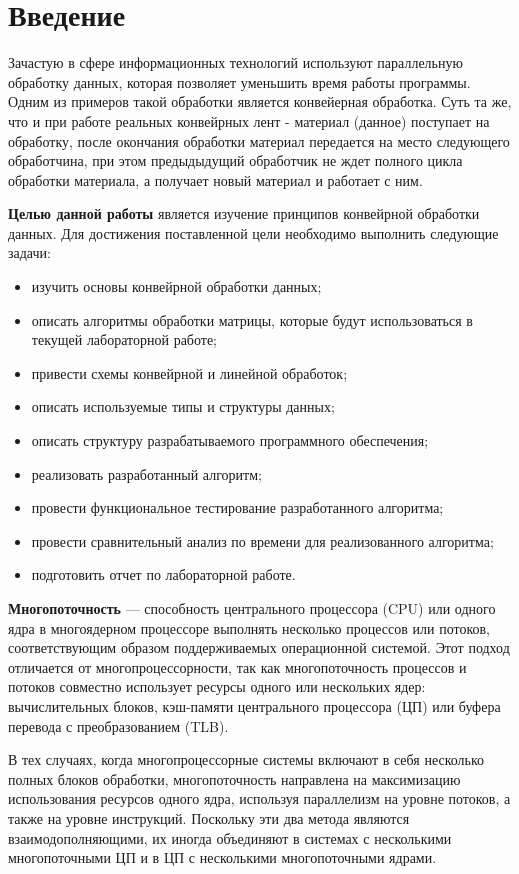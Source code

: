\chapter*{Введение}
Зачастую в сфере информационных технологий используют параллельную обработку данных, которая позволяет уменьшить время работы программы. Одним из примеров такой обработки является конвейерная обработка.
Суть та же, что и при работе реальных конвейрных лент - материал (данное) поступает на обработку, после окончания обработки материал передается на место следующего обработчина, при этом предыдыдущий обработчик не ждет полного цикла обработки материала, а получает новый материал и работает с ним.


\textbf{Целью данной работы} является изучение принципов конвейрной обработки данных. 
Для достижения поставленной цели необходимо выполнить следующие задачи:
\begin{itemize}[label=---]
	\item изучить основы конвейрной обработки данных;
    \item описать алгоритмы обработки матрицы, которые будут использоваться в текущей лабораторной работе;
    \item привести схемы конвейрной и линейной обработок;
    \item описать используемые типы и структуры данных;
    \item описать структуру разрабатываемого программного обеспечения;
    \item реализовать разработанный алгоритм;
    \item провести функциональное тестирование разработанного алгоритма;
    \item провести сравнительный анализ по времени для реализованного алгоритма;
    \item подготовить отчет по лабораторной работе.
\end{itemize}

\textbf{Многопоточность} \cite{mnog} --- способность центрального процессора (CPU) или одного ядра в многоядерном процессоре выполнять несколько процессов или потоков, соответствующим образом поддерживаемых операционной системой. Этот подход отличается от многопроцессорности, так как многопоточность процессов и потоков совместно использует ресурсы одного или нескольких ядер: вычислительных блоков, кэш-памяти центрального процессора (ЦП) или буфера перевода с преобразованием (TLB).

В тех случаях, когда многопроцессорные системы включают в себя несколько полных блоков обработки, многопоточность направлена на максимизацию использования ресурсов одного ядра, используя параллелизм на уровне потоков, а также на уровне инструкций. Поскольку эти два метода являются взаимодополняющими, их иногда объединяют в системах с несколькими многопоточными ЦП и в ЦП с несколькими многопоточными ядрами.

